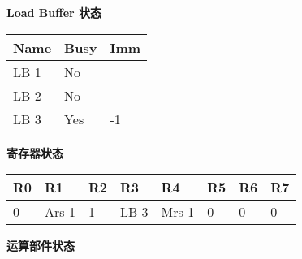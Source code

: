 \documentclass{article}
\newlength\tablewidth
\begin{document}
\textbf{Load Buffer 状态}


\begin{center}
\setlength\tablewidth{\dimexpr (\textwidth -6\tabcolsep)}
\begin{tabular}{|p{0.353\tablewidth}<{\centering}|p{0.353\tablewidth}<{\centering}|p{0.294\tablewidth}<{\centering}|}
\hline
\rowcolor{tabletopgray}
\textbf{ Name }&\textbf{ Busy }&\textbf{ Imm }\\
\hline
 LB 1 & No   &     \\
\hline
 LB 2 & No   &     \\
\hline
 LB 3 & Yes  & {-}1  \\
\hline
\end{tabular}
\end{center}



\textbf{寄存器状态}


\begin{center}
\setlength\tablewidth{\dimexpr (\textwidth -16\tabcolsep)}
\begin{tabular}{|p{0.111\tablewidth}<{\centering}|p{0.156\tablewidth}<{\centering}|p{0.111\tablewidth}<{\centering}|p{0.133\tablewidth}<{\centering}|p{0.156\tablewidth}<{\centering}|p{0.111\tablewidth}<{\centering}|p{0.111\tablewidth}<{\centering}|p{0.111\tablewidth}<{\centering}|}
\hline
\rowcolor{tabletopgray}
\textbf{ R0  }&\textbf{ R1    }&\textbf{ R2  }&\textbf{ R3   }&\textbf{ R4    }&\textbf{ R5  }&\textbf{ R6  }&\textbf{ R7  }\\
\hline
 0   & Ars 1 & 1   & LB 3 & Mrs 1 & 0   & 0   & 0   \\
\hline
\end{tabular}
\end{center}



\textbf{运算部件状态}
\end{document}
